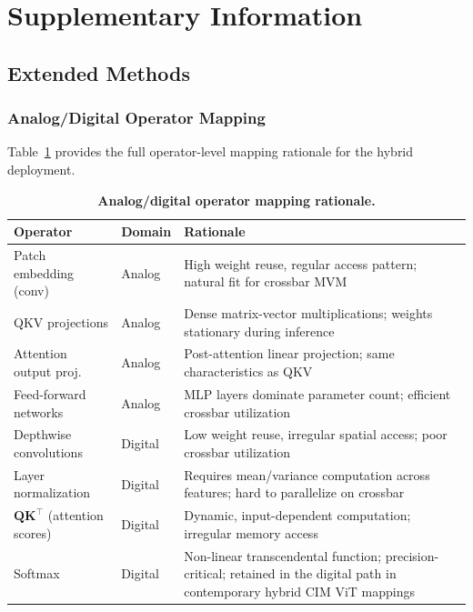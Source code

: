 \section{Supplementary Information}
\label{sec:supplementary}

\renewcommand{\thefigure}{S\arabic{figure}}
\renewcommand{\thetable}{S\arabic{table}}
\setcounter{figure}{0}
\setcounter{table}{0}

\subsection{Extended Methods}
\label{subsec:extended-methods}

\subsubsection{Analog/Digital Operator Mapping}
\label{subsec:supp-operator-mapping}

Table~\ref{tab:supp-operator-mapping} provides the full operator-level mapping rationale for the hybrid deployment.

\begin{table}[ht]
\centering
\caption{\textbf{Analog/digital operator mapping rationale.}}
\label{tab:supp-operator-mapping}
\small
\begin{tabular}{@{}ll>{\raggedright\arraybackslash}p{6.5cm}@{}}
\toprule
\textbf{Operator} & \textbf{Domain} & \textbf{Rationale} \\
\midrule
Patch embedding (conv) & Analog & High weight reuse, regular access pattern; natural fit for crossbar MVM \\
QKV projections & Analog & Dense matrix-vector multiplications; weights stationary during inference \\
Attention output proj. & Analog & Post-attention linear projection; same characteristics as QKV \\
Feed-forward networks & Analog & MLP layers dominate parameter count; efficient crossbar utilization \\
\midrule
Depthwise convolutions & Digital & Low weight reuse, irregular spatial access; poor crossbar utilization \citep{wu2023bwq} \\
Layer normalization & Digital & Requires mean/variance computation across features; hard to parallelize on crossbar \\
$\mathbf{QK}^{\top}$ (attention scores) & Digital & Dynamic, input-dependent computation; irregular memory access \citep{liu2024hardsea} \\
Softmax & Digital & Non-linear transcendental function; precision-critical; retained in the digital path in contemporary hybrid CIM ViT mappings \citep{wang2025hemlet,liu2024hardsea} \\
\bottomrule
\end{tabular}
\end{table}

